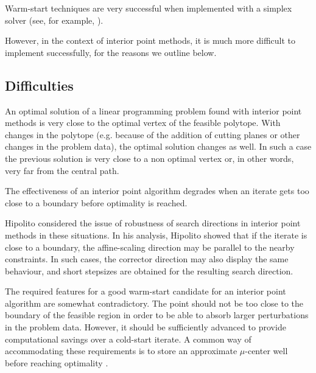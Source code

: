 Warm-start techniques are very successful 
when implemented with a simplex solver (see, for example, 
\cite{Bixby02}). 


However, in the context of interior point methods, it 
is much more difficult to implement successfully, for the reasons
we outline below.

%
%
\subsection{Difficulties}
\label{sec:WarmStartDifficulties}

An optimal solution of a linear programming problem found with 
interior point methods is very close to the optimal vertex of 
the feasible polytope. With changes in the polytope (e.g. because 
of the addition of cutting planes or other changes in the 
problem data), the optimal solution changes as well.
In such a case the previous solution is very close to a non optimal
vertex or, in other words, very far from the central path. 

The effectiveness of an interior point algorithm degrades when an 
iterate gets too close to a boundary before optimality is reached. 


Hipolito \cite{Hipolito} considered the issue of robustness of 
search directions in interior point methods in these situations.
In his analysis, Hipolito showed that if the iterate is close 
to a boundary, the affine-scaling direction may be parallel to 
the nearby constraints. In such cases, the corrector direction 
may also display the same behaviour, and short stepsizes are 
obtained for the resulting search direction.

The required features for a good warm-start candidate for an
interior point algorithm are somewhat contradictory.
The point should not be too close to the boundary of the feasible 
region in order to be able to absorb larger perturbations in the 
problem data. 
However, it should be sufficiently advanced to provide 
computational savings over a cold-start iterate.
A common way of accommodating these requirements is to store an 
approximate $\mu$-center well before reaching optimality 
\cite{Gondzio98,GondzioGrothey03,GondzioVial,YildirimWright}.

